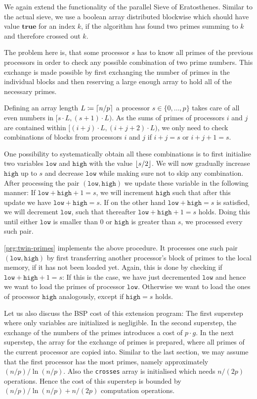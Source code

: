\documentclass[a4paper,12pt]{article}
\DeclarePairedDelimiter\ceil{\lceil}{\rceil}
\DeclarePairedDelimiter\floor{\lfloor}{\rfloor}
\begin{document}
We again extend the functionality of the parallel Sieve of Eratosthenes.
Similar to the actual sieve, we use a boolean array distributed blockwise which should have value $\mathbf{true}$ for an index $k$, if the algorithm has found two primes summing to $k$ and therefore crossed out $k$.

The problem here is, that some processor $s$ has to know all primes of the previous processors in order to check any possible combination of two prime numbers.
This exchange is made possible by first exchanging the number of primes in the individual blocks and then reserving a large enough array to hold all of the necessary primes.

Defining an array length $L\coloneqq \ceil{n/p}$ a processor $s\in\{0, \dots, p\}$ takes care of all even numbers in $[s\cdot L, (s+1)\cdot L)$.
As the sums of primes of processors $i$ and $j$ are contained within $[(i+j)\cdot L, (i+j+2)\cdot L)$, we only need to check combinations of blocks from processors $i$ and $j$ if $i+j=s$ or $i+j+1=s$.

\newcommand{\low}{\texttt{low}}\newcommand{\high}{\texttt{high}}
One possibility to systematically obtain all these combinations is to first initialise two variables $\low$ and $\high$ with the value $\floor{s / 2}$.
We will now gradually increase $\high$ up to $s$ and decrease $\low$ while making sure not to skip any combination.
After processing the pair $(\low, \high)$ we update these variable in the following manner:
If $\low + \high + 1 = s$, we will increment $\high$ such that after this update we have $\low + \high = s$.
If on the other hand $\low + \high = s$ is satisfied, we will decrement $\low$, such that thereafter $\low + \high + 1 = s$ holds.
Doing this until either $\low$ is smaller than $0$ or $\high$ is greater than $s$, we processed every such pair.

\autoref{prg:twin-primes} implements the above procedure.
It processes one such pair $(\low, \high)$ by first transferring another processor's block of primes to the local memory, if it has not been loaded yet.
Again, this is done by checking if $\low + \high + 1 = s$: If this is the case, we have just decremented $\low$ and hence we want to load the primes of processor $\low$.
Otherwise we want to load the ones of processor $\high$ analogously, except if $\high = s$ holds.

Let us also discuss the BSP cost of this extension program:
The first superstep where only variables are initialized is negligible.
In the second superstep, the exchange of the numbers of the primes introduces a cost of $p\cdot g$.
In the next superstep, the array for the exchange of primes is prepared, where all primes of the current processor are copied into.
Similar to the last section, we may assume that the first processor has the most primes, namely approximately $(n/p)/\ln(n/p)$.
Also the \texttt{crosses} array is initialised which needs $n/(2p)$ operations.
Hence the cost of this superstep is bounded by $(n/p) / \ln(n/p) + n/(2p)$ computation operations.
\end{document}
